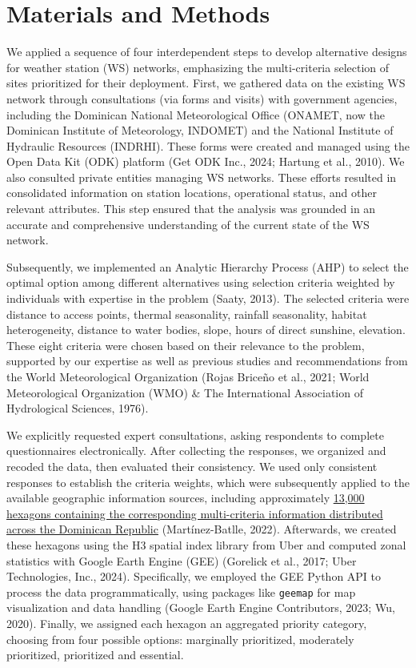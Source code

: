 \documentclass[spanish]{article}
\begin{document}
\hypertarget{materials-and-methods}{%
\section{Materials and Methods}\label{materials-and-methods}}

We applied a sequence of four interdependent steps to develop
alternative designs for weather station (WS) networks, emphasizing the
multi-criteria selection of sites prioritized for their deployment.
First, we gathered data on the existing WS network through consultations
(via forms and visits) with government agencies, including the Dominican
National Meteorological Office (ONAMET, now the Dominican Institute of
Meteorology, INDOMET) and the National Institute of Hydraulic Resources
(INDRHI). These forms were created and managed using the Open Data Kit
(ODK) platform (Get ODK Inc., 2024; Hartung et al., 2010). We also
consulted private entities managing WS networks. These efforts resulted
in consolidated information on station locations, operational status,
and other relevant attributes. This step ensured that the analysis was
grounded in an accurate and comprehensive understanding of the current
state of the WS network.

Subsequently, we implemented an Analytic Hierarchy Process (AHP) to
select the optimal option among different alternatives using selection
criteria weighted by individuals with expertise in the problem (Saaty,
2013). The selected criteria were distance to access points, thermal
seasonality, rainfall seasonality, habitat heterogeneity, distance to
water bodies, slope, hours of direct sunshine, elevation. These eight
criteria were chosen based on their relevance to the problem, supported
by our expertise as well as previous studies and recommendations from
the World Meteorological Organization (Rojas Briceño et al., 2021; World
Meteorological Organization (WMO) \& The International Association of
Hydrological Sciences, 1976).

We explicitly requested expert consultations, asking respondents to
complete questionnaires electronically. After collecting the responses,
we organized and recoded the data, then evaluated their consistency. We
used only consistent responses to establish the criteria weights, which
were subsequently applied to the available geographic information
sources, including approximately
\href{https://geofis.github.io/zonal-statistics/README.html}{13,000
hexagons containing the corresponding multi-criteria information
distributed across the Dominican Republic} (Martínez-Batlle, 2022).
Afterwards, we created these hexagons using the H3 spatial index library
from Uber and computed zonal statistics with Google Earth Engine (GEE)
(Gorelick et al., 2017; Uber Technologies, Inc., 2024). Specifically, we
employed the GEE Python API to process the data programmatically, using
packages like \texttt{geemap} for map visualization and data handling
(Google Earth Engine Contributors, 2023; Wu, 2020). Finally, we assigned
each hexagon an aggregated priority category, choosing from four
possible options: marginally prioritized, moderately prioritized,
prioritized and essential.
\end{document}
